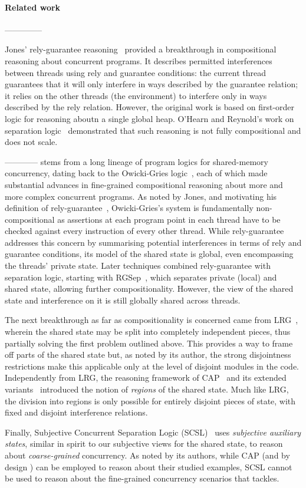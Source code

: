 \paragraph{Related work}

--------------

Jones' rely-guarantee reasoning~\cite{rg} provided a
breakthrough in compositional reasoning about concurrent programs. It
describes permitted interferences between threads using rely and
guarantee conditions: the current thread guarantees that it will only
interfere in ways described by the guarantee relation; it relies on
the other threads (the environment) to interfere only  in ways
described by the rely relation. However, the original work is based on
first-order logic for reasoning aboutn
a single global heap. O'Hearn and Reynold's
work on separation logic~\cite{2001popland john's survey} demonstrated that such reasoning is not
fully compositional and does not scale. 

------------
\colosl stems from a long lineage of program logics for shared-memory
concurrency, dating back to the Owicki-Gries logic~\cite{owicki}, each of
which made substantial advances in fine-grained compositional
reasoning about more and more complex concurrent programs. As noted by
Jones, and motivating his definition of rely-guarantee~\cite{rg},
Owicki-Gries's system is fundamentally non-compositional as assertions
at each program point in each thread have to be checked against every
instruction of every other thread. While rely-guarantee addresses
this concern by summarising potential interferences in terms of rely
and guarantee conditions, its model of the shared state is global,
even encompassing the threads' private state. Later techniques
combined rely-guarantee with separation logic, starting with
RGSep~\cite{viktor-marriage}, which separates private (local) and
shared state, allowing further compositionality. However, the view of
the shared state and interference on it is still globally shared
across threads. 

The next breakthrough as far as compositionality is
concerned came from LRG~\cite{lrg}, wherein the shared state may be
split into completely independent pieces, thus partially solving the
first problem outlined above. This provides a way to frame off parts
of the shared state but, as noted by its author, the strong
disjointness restrictions make this applicable only at the level of
disjoint modules in the code. Independently from LRG, the reasoning
framework of CAP~\cite{cap-ecoop10}
and its extended variants~\cite{icap,tada} introduced the notion
of \emph{regions} of the shared state. Much like LRG, the division into
regions is only possible for entirely disjoint pieces of state, with
fixed and disjoint interference relations.

Finally, Subjective Concurrent Separation Logic (SCSL)~\cite{SCSL}
uses \emph{subjective auxiliary states}, similar in spirit to our
subjective views for the shared state, to reason about \emph{coarse-grained}
concurrency. As noted by its authors, while CAP (and by design \colosl) can
be employed to reason about their studied examples, SCSL cannot be
used to reason about the fine-grained concurrency scenarios that \colosl tackles.
